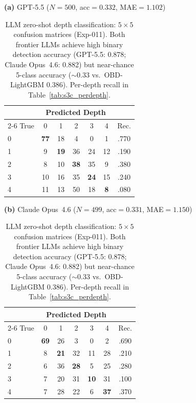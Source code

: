 \begin{table}[t]
  \centering
  \scriptsize
  \caption{LLM zero-shot depth classification: $5{\times}5$ confusion matrices (Exp-011). Both frontier LLMs achieve high binary detection accuracy (GPT-5.5: 0.878; Claude Opus~4.6: 0.882) but near-chance 5-class accuracy (${\sim}$0.33 vs.\ OBD-LightGBM 0.386). Per-depth recall in Table~\ref{tab:s3c_perdepth}.}
  \label{tab:s3_llm_zeroshot}

  \vspace{0.3em}
  \textbf{(a)} GPT-5.5 ($N{=}500$, acc${=}0.332$, MAE${=}1.102$)
  \vspace{1pt}

  \begin{tabular}{lcccccc}
    \toprule
    & \multicolumn{5}{c}{Predicted Depth} & \\
    \cmidrule(lr){2-6}
    True & 0 & 1 & 2 & 3 & 4 & Rec. \\
    \midrule
    0 & \textbf{77} & 18 &  4 &  0 &  1 & .770 \\
    1 &  9 & \textbf{19} & 36 & 24 & 12 & .190 \\
    2 &  8 & 10 & \textbf{38} & 35 &  9 & .380 \\
    3 & 10 & 16 & 35 & \textbf{24} & 15 & .240 \\
    4 & 11 & 13 & 50 & 18 &  \textbf{8} & .080 \\
    \bottomrule
  \end{tabular}

  \vspace{4pt}
  \textbf{(b)} Claude Opus~4.6 ($N{=}499$, acc${=}0.331$, MAE${=}1.150$)
  \vspace{1pt}

  \begin{tabular}{lcccccc}
    \toprule
    & \multicolumn{5}{c}{Predicted Depth} & \\
    \cmidrule(lr){2-6}
    True & 0 & 1 & 2 & 3 & 4 & Rec. \\
    \midrule
    0 & \textbf{69} & 26 &  3 &  0 &  2 & .690 \\
    1 &  8 & \textbf{21} & 32 & 11 & 28 & .210 \\
    2 &  6 & 36 & \textbf{28} &  5 & 25 & .280 \\
    3 &  7 & 20 & 31 & \textbf{10} & 31 & .100 \\
    4 &  7 & 28 & 22 &  6 & \textbf{37} & .370 \\
    \bottomrule
  \end{tabular}
\end{table}

